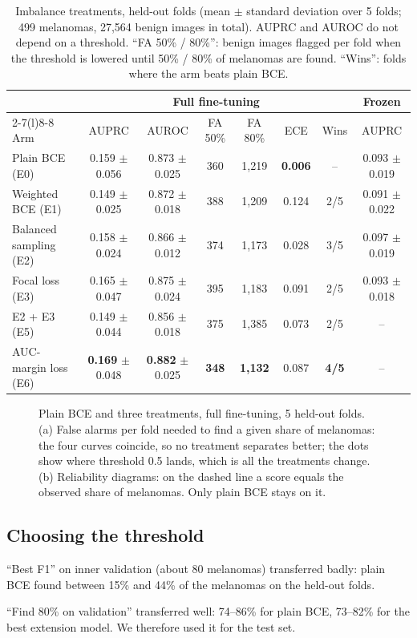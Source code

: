 \begin{table}[t]
\centering
\caption{Imbalance treatments, held-out folds (mean $\pm$ standard deviation over 5 folds; 499 melanomas, 27,564 benign images in total). AUPRC and AUROC do not depend on a threshold. ``FA 50\% / 80\%'': benign images flagged per fold when the threshold is lowered until 50\% / 80\% of melanomas are found. ``Wins'': folds where the arm beats plain BCE.}
\label{tab:grid}
\small
\begin{tabular}{@{}lccccccc@{}}
\toprule
 & \multicolumn{6}{c}{Full fine-tuning} & Frozen \\
\cmidrule(lr){2-7}\cmidrule(l){8-8}
Arm & AUPRC & AUROC & FA 50\% & FA 80\% & ECE & Wins & AUPRC \\
\midrule
Plain BCE (E0)          & 0.159 $\pm$ 0.056 & 0.873 $\pm$ 0.025 & 360 & 1,219 & \textbf{0.006} & -- & 0.093 $\pm$ 0.019 \\
Weighted BCE (E1)       & 0.149 $\pm$ 0.025 & 0.872 $\pm$ 0.018 & 388 & 1,209 & 0.124 & 2/5 & 0.091 $\pm$ 0.022 \\
Balanced sampling (E2)  & 0.158 $\pm$ 0.024 & 0.866 $\pm$ 0.012 & 374 & 1,173 & 0.028 & 3/5 & 0.097 $\pm$ 0.019 \\
Focal loss (E3)         & 0.165 $\pm$ 0.047 & 0.875 $\pm$ 0.024 & 395 & 1,183 & 0.091 & 2/5 & 0.093 $\pm$ 0.018 \\
E2 + E3 (E5)            & 0.149 $\pm$ 0.044 & 0.856 $\pm$ 0.018 & 375 & 1,385 & 0.073 & 2/5 & -- \\
AUC-margin loss (E6)    & \textbf{0.169} $\pm$ 0.048 & \textbf{0.882} $\pm$ 0.025 & \textbf{348} & \textbf{1,132} & 0.087 & \textbf{4/5} & -- \\
\bottomrule
\end{tabular}
\end{table}

\begin{figure}[t]
\centering
{}
\caption{Plain BCE and three treatments, full fine-tuning, 5 held-out folds. (a) False alarms per fold needed to find a given share of melanomas: the four curves coincide, so no treatment separates better; the dots show where threshold 0.5 lands, which is all the treatments change. (b) Reliability diagrams: on the dashed line a score equals the observed share of melanomas. Only plain BCE stays on it.}
\label{fig:tradeoff}
\end{figure}

\subsection{Choosing the threshold}
\begin{notes}
  \item ``Best F1'' on inner validation (about 80 melanomas) transferred badly: plain BCE found between 15\% and 44\% of the melanomas on the held-out folds.
  \item ``Find 80\% on validation'' transferred well: 74--86\% for plain BCE, 73--82\% for the best extension model. We therefore used it for the test set.
\end{notes}

